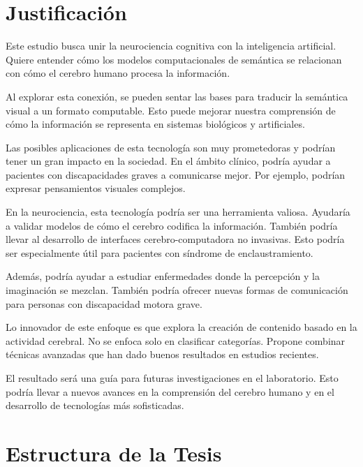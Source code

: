 \section{Justificación}

Este estudio busca unir la neurociencia cognitiva con la inteligencia artificial. 
Quiere entender cómo los modelos computacionales de semántica se relacionan con cómo el 
cerebro humano procesa la información.

Al explorar esta conexión, se pueden sentar las bases para traducir la semántica visual
a un formato computable. Esto puede mejorar nuestra comprensión de cómo la información
se representa en sistemas biológicos y artificiales.

Las posibles aplicaciones de esta tecnología son muy prometedoras y podrían tener un gran 
impacto en la sociedad. En el ámbito clínico, podría ayudar a pacientes con discapacidades graves a comunicarse mejor. Por ejemplo, podrían expresar pensamientos visuales complejos.

En la neurociencia, esta tecnología podría ser una herramienta valiosa. Ayudaría a 
validar modelos de cómo el cerebro codifica la información. También podría llevar al 
desarrollo de interfaces cerebro-computadora no invasivas. Esto podría ser especialmente 
útil para pacientes con síndrome de enclaustramiento.

Además, podría ayudar a estudiar enfermedades donde la percepción y la imaginación se 
mezclan. También podría ofrecer nuevas formas de comunicación para personas con 
discapacidad motora grave.

Lo innovador de este enfoque es que explora la creación de contenido basado en la 
actividad cerebral. No se enfoca solo en clasificar categorías. Propone combinar técnicas 
avanzadas que han dado buenos resultados en estudios recientes.

El resultado será una guía para futuras investigaciones en el laboratorio. Esto podría 
llevar a nuevos avances en la comprensión del cerebro humano y en el desarrollo de 
tecnologías más sofisticadas.

\section{Estructura de la Tesis}

